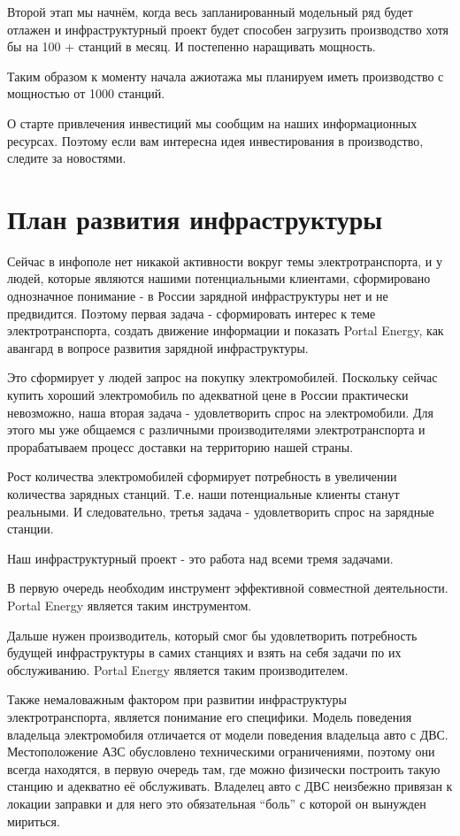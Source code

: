 \documentclass[a4paper,12pt]{report}
\begin{document}
Второй этап мы начнём, когда весь запланированный модельный ряд будет отлажен и инфраструктурный проект будет способен загрузить производство хотя бы на 100 + станций в месяц. И постепенно наращивать мощность.

Таким образом к моменту начала ажиотажа мы планируем иметь производство с мощностью от 1000 станций.

О старте привлечения инвестиций мы сообщим на наших информационных ресурсах. Поэтому если вам интересна идея инвестирования в производство, следите за новостями. 


\chapter{План развития инфраструктуры}
Сейчас в инфополе нет никакой активности вокруг темы электротранспорта, и у людей, которые являются нашими потенциальными клиентами, сформировано однозначное понимание - в России зарядной инфраструктуры нет и не предвидится. Поэтому первая задача - сформировать интерес к теме электротранспорта, создать движение информации и показать Portal Energy, как авангард в вопросе развития зарядной инфраструктуры.

Это сформирует у людей запрос на покупку электромобилей. Поскольку сейчас купить хороший электромобиль по адекватной цене в России практически невозможно, наша вторая задача - удовлетворить спрос на электромобили. Для этого мы уже общаемся с различными производителями электротранспорта и прорабатываем процесс доставки на территорию нашей страны. 

Рост количества электромобилей сформирует потребность в увеличении количества зарядных станций. Т.е. наши потенциальные клиенты станут реальными. И следовательно, третья задача - удовлетворить спрос на зарядные станции.

Наш инфраструктурный проект - это работа над всеми тремя задачами. 

В первую очередь необходим инструмент эффективной совместной деятельности. Portal Energy является таким инструментом. 

Дальше нужен производитель, который смог бы удовлетворить потребность будущей инфраструктуры в самих станциях и взять на себя задачи по их обслуживанию. Portal Energy является таким производителем.

Также немаловажным фактором при развитии инфраструктуры электротранспорта, является понимание его специфики. Модель поведения владельца электромобиля отличается от модели поведения владельца авто с ДВС. Местоположение АЗС обусловлено техническими ограничениями, поэтому они всегда находятся, в первую очередь там, где можно физически построить такую станцию и адекватно её обслуживать. Владелец авто с ДВС неизбежно привязан к локации заправки и для него это обязательная “боль” с которой он вынужден мириться. 
\end{document}
